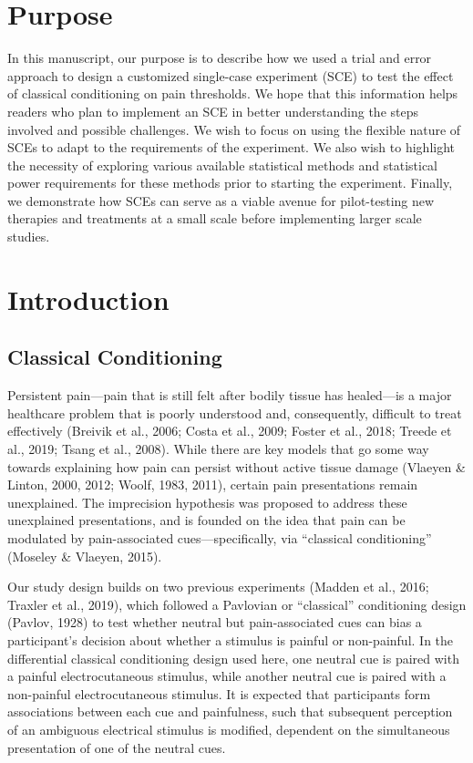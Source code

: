\documentclass{article}
\begin{document}
\section{Purpose}

In this manuscript, our purpose is to describe how we used a trial and error approach to design a customized single-case experiment (SCE) to test the effect of classical conditioning on pain thresholds. We hope that this information helps readers who plan to implement an SCE in better understanding the steps involved and possible challenges. We wish to focus on using the flexible nature of SCEs to adapt to the requirements of the experiment. We also wish to highlight the necessity of exploring various available statistical methods and statistical power requirements for these methods prior to starting the experiment. Finally, we demonstrate how SCEs can serve as a viable avenue for pilot-testing new therapies and treatments at a small scale before implementing larger scale studies.

\section{Introduction}

\subsection{Classical Conditioning}

Persistent pain—pain that is still felt after bodily tissue has healed—is a major healthcare problem that is poorly understood and, consequently, difficult to treat effectively (Breivik et al., 2006; Costa et al., 2009; Foster et al., 2018; Treede et al., 2019; Tsang et al., 2008). While there are key models that go some way towards explaining how pain can persist without active tissue damage (Vlaeyen \& Linton, 2000, 2012; Woolf, 1983, 2011), certain pain presentations remain unexplained. The imprecision hypothesis was proposed to address these unexplained presentations, and is founded on the idea that pain can be modulated by pain-associated cues—specifically, via “classical conditioning” (Moseley \& Vlaeyen, 2015). 

Our study design builds on two previous experiments (Madden et al., 2016; Traxler et al., 2019), which followed a Pavlovian or “classical” conditioning design (Pavlov, 1928) to test whether neutral but pain-associated cues can bias a participant's decision about whether a stimulus is painful or non-painful. In the differential classical conditioning design used here, one neutral cue is paired with a painful electrocutaneous stimulus, while another neutral cue is paired with a non-painful electrocutaneous stimulus. It is expected that participants form associations between each cue and painfulness, such that subsequent perception of an ambiguous electrical stimulus is modified, dependent on the simultaneous presentation of one of the neutral cues.
\end{document}
